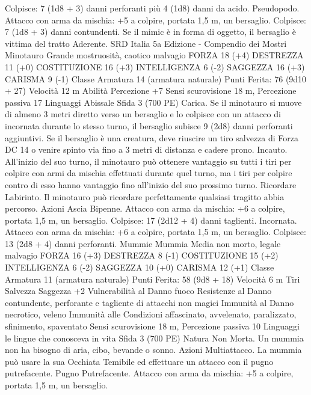 \begin{multicols}{2}
Colpisce: 7 (1d8 + 3) danni perforanti più 4 (1d8) danni da
acido.
Pseudopodo. Attacco con arma da mischia: +5 a colpire, portata
1,5 m, un bersaglio.
Colpisce: 7 (1d8 + 3) danni contundenti. Se il mimic è in forma
di oggetto, il bersaglio è vittima del tratto Aderente.
SRD Italia 5a Edizione - Compendio dei Mostri
Minotauro
Grande mostruosità, caotico malvagio
FORZA 18 (+4)
DESTREZZA 11 (+0)
COSTITUZIONE 16 (+3)
INTELLIGENZA 6 (-2)
SAGGEZZA 16 (+3)
CARISMA 9 (-1)
Classe Armatura 14 (armatura naturale)
\hspace*{0pt}\hfill{Punti Ferita}: 76 (9d10 + 27)
Velocità 12 m
Abilità Percezione +7
Sensi scurovisione 18 m, Percezione passiva 17
Linguaggi Abissale
Sfida 3 (700 PE)
Carica. Se il minotauro si muove di almeno 3 metri diretto verso
un bersaglio e lo colpisce con un attacco di incornata durante lo
stesso turno, il bersaglio subisce 9 (2d8) danni perforanti
aggiuntivi. Se il bersaglio è una creatura, deve riuscire un tiro
salvezza di Forza DC 14 o venire spinto via fino a 3 metri di
distanza e cadere prono.
Incauto. All’inizio del suo turno, il minotauro può ottenere
vantaggio su tutti i tiri per colpire con armi da mischia effettuati
durante quel turno, ma i tiri per colpire contro di esso hanno
vantaggio fino all’inizio del suo prossimo turno.
Ricordare Labirinto. Il minotauro può ricordare perfettamente
qualsiasi tragitto abbia percorso.
Azioni
Ascia Bipenne. Attacco con arma da mischia: +6 a colpire,
portata 1,5 m, un bersaglio.
Colpisce: 17 (2d12 + 4) danni taglienti.
Incornata. Attacco con arma da mischia: +6 a colpire, portata
1,5 m, un bersaglio.
Colpisce: 13 (2d8 + 4) danni perforanti.
Mummie
Mummia
Media non morto, legale malvagio
FORZA 16 (+3)
DESTREZZA 8 (-1)
COSTITUZIONE 15 (+2)
INTELLIGENZA 6 (-2)
SAGGEZZA 10 (+0)
CARISMA 12 (+1)
Classe Armatura 11 (armatura naturale)
\hspace*{0pt}\hfill{Punti Ferita}: 58 (9d8 + 18)
Velocità 6 m
Tiri Salvezza Saggezza +2
Vulnerabilità al Danno fuoco
Resistenze al Danno contundente, perforante e tagliente di
attacchi non magici
Immunità al Danno necrotico, veleno
Immunità alle Condizioni affascinato, avvelenato, paralizzato,
sfinimento, spaventato
Sensi scurovisione 18 m, Percezione passiva 10
Linguaggi le lingue che conosceva in vita
Sfida 3 (700 PE)
Natura Non Morta. Un mummia non ha bisogno di aria, cibo,
bevande o sonno.
Azioni
Multiattacco. La mummia può usare la sua Occhiata Temibile ed
effettuare un attacco con il pugno putrefacente.
Pugno Putrefacente. Attacco con arma da mischia: +5 a colpire,
portata 1,5 m, un bersaglio.

\end{multicols}
